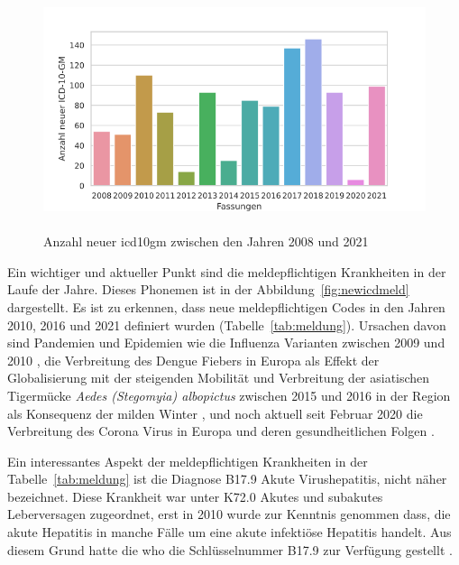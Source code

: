 
\begin{figure}[ht]
	\centering
	\includegraphics[height=7cm]{figures/newicdyear}
	\caption[Neue \acs{icd10gm} pro Jahr]{Anzahl neuer \acs{icd10gm} zwischen den Jahren 2008 und 2021}
	\label{fig:newicdyear}
\end{figure} 

Ein wichtiger und aktueller Punkt sind die meldepflichtigen Krankheiten in der Laufe der Jahre. Dieses Phonemen ist in der Abbildung~\ref{fig:newicdmeld} dargestellt. Es ist zu erkennen, dass neue meldepflichtigen Codes in den Jahren 2010, 2016 und 2021 definiert wurden (Tabelle~\ref{tab:meldung}). Ursachen davon sind Pandemien und Epidemien wie die Influenza Varianten zwischen 2009 und 2010 \cite{influenza1, influenza2}, die Verbreitung des Dengue Fiebers in Europa als Effekt der Globalisierung mit der steigenden Mobilität \cite{denge1} und Verbreitung der asiatischen Tigermücke \textsl{Aedes (Stegomyia) albopictus} zwischen 2015 und 2016 in der Region als Konsequenz der milden Winter \cite{denge2}, und noch aktuell seit Februar 2020 die Verbreitung des Corona Virus in Europa \cite{corona1} und deren gesundheitlichen Folgen \cite{corona2}. 

Ein interessantes Aspekt der meldepflichtigen Krankheiten in der Tabelle~\ref{tab:meldung} ist die Diagnose \textsf{B17.9} \textsf{Akute Virushepatitis, nicht näher bezeichnet}. Diese Krankheit war unter \textsf{K72.0} \textsf{Akutes und subakutes Leberversagen} zugeordnet, erst in 2010 wurde zur Kenntnis genommen dass, die akute Hepatitis in manche Fälle um eine akute infektiöse Hepatitis handelt. Aus diesem Grund hatte die \ac{who} die Schlüsselnummer \textsf{B17.9} zur Verfügung gestellt \cite{komm10}.

\clearpage

